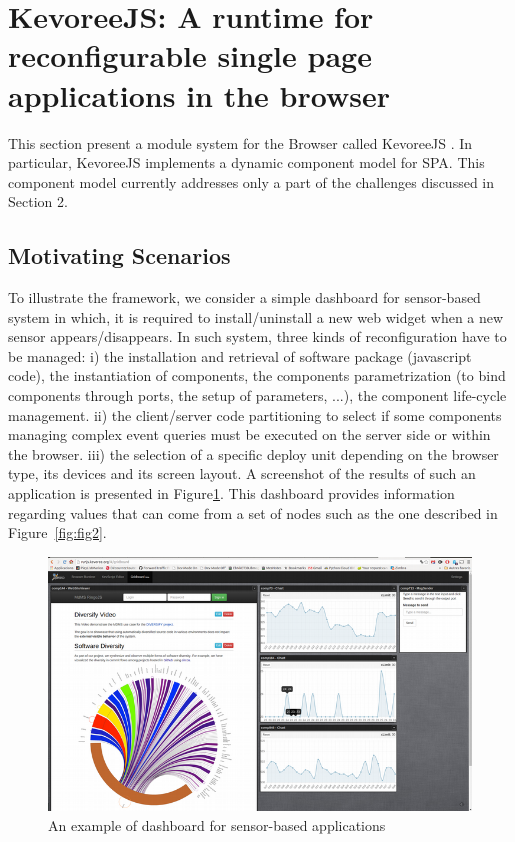 \section{KevoreeJS: A runtime for reconfigurable single page applications in the browser}

This section present a module system for the Browser called KevoreeJS .
In particular, KevoreeJS implements a dynamic component model for SPA.
This component model currently addresses only a part of the challenges discussed in Section 2.

\subsection{Motivating Scenarios }
To illustrate the framework, we consider a simple dashboard for sensor-based system in which, it is required to install/uninstall a new web widget when a new sensor appears/disappears. In such system, three kinds of reconfiguration have to be managed: i) the installation and retrieval of software package (javascript code), the instantiation of components, the components parametrization (to bind components through ports, the setup of parameters, ...), the component life-cycle management. ii)  the client/server code partitioning to select if some components managing complex event queries must be executed on the server side or within the browser. iii) the selection of a specific deploy unit depending on the browser type, its devices and its screen layout. A screenshot of the results of such an application is presented in Figure\ref{fig:fig1}. This dashboard provides information regarding values that can come from a set of nodes such as the one described in Figure~\ref{fig:fig2}.


\begin{figure}[h]
	\centering
	\includegraphics[width=1\linewidth]{figures/fig3}
	\caption{An example of dashboard for sensor-based applications}
	\label{fig:fig1}
\end{figure}


